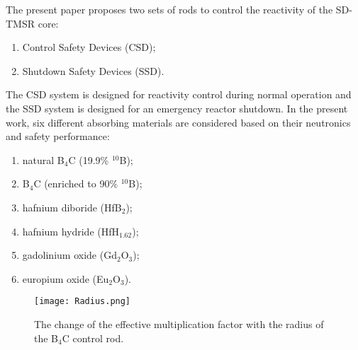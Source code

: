 The present paper proposes two sets of rods to control the reactivity of the SD-TMSR core:
\begin{enumerate}
\item Control Safety Devices (CSD);
\item Shutdown Safety Devices (SSD).
\end{enumerate}
The CSD system is designed for reactivity control during normal operation and the SSD system is designed for an emergency reactor shutdown.
In the present work, six different absorbing materials are considered based on their neutronics and safety performance:
\begin{enumerate}
\item natural B$_4$C (19.9\% $^{10}$B);
\item B$_4$C (enriched to 90\% $^{10}$B);
\item hafnium diboride (HfB$_2$);
\item hafnium hydride (HfH$_{1.62}$);
\item gadolinium oxide (Gd$_2$O$_3$);
\item europium oxide (Eu$_2$O$_3$).
\end{enumerate}

\begin{figure}[t!]  %
	\centering
	\hspace{+0.65in} 
	\texttt{[image: Radius.png]}
	\caption{The change of the effective multiplication factor with the radius of the B$_4$C control rod.}
	\label{fig:Radius}
\end{figure}

